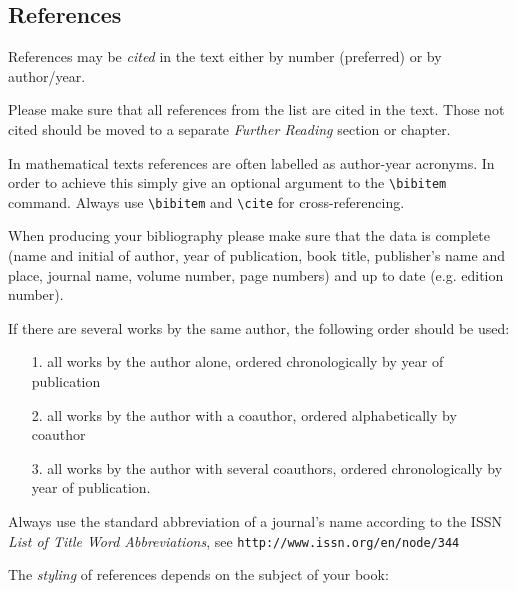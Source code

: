 \documentclass[graybox]{svmono}
\begin{document}
\subsection{References}

References may be \emph{cited} in the text either by number (preferred) or by author/year.

Please make sure that all references from the list are cited in the text. Those not cited should be moved to a separate \emph{Further Reading} section or chapter.

In mathematical texts references are often labelled as author-year acronyms. In order to achieve this simply give an optional argument to the \verb|\bibitem| command. Always use \verb|\bibitem| and \verb|\cite| for cross-referencing.

When producing your bibliography please make sure that the data is complete (name and initial of author, year of publication, book title, publisher's name and place, journal name, volume number, page numbers) and up to date (e.g. edition number).

If there are several works by the same author, the following order should be used:

\begin{enumerate}
\item[1.] all works by the author alone, ordered chronologically by year of publication
\item[2.] all works by the author with a coauthor, ordered alphabetically by coauthor
\item[3.] all works by the author with several coauthors, ordered chronologically by year of publication.
\end{enumerate}

Always use the standard abbreviation of a journal's name according to the ISSN \textit{List of Title Word Abbreviations}, see \texttt{http://www.issn.org/en/node/344}

The \emph{styling} of references depends on the subject of your book:
\end{document}
